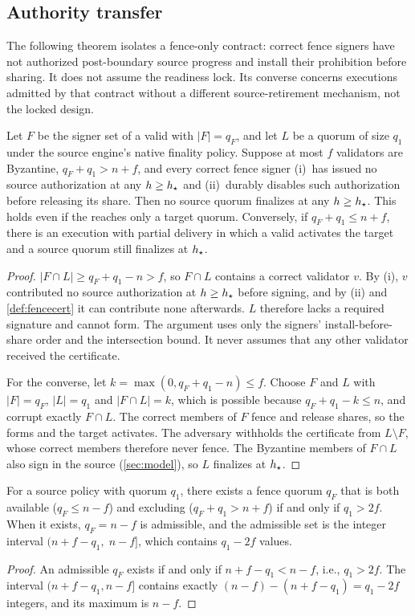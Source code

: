 \subsection{Authority transfer}
The following theorem isolates a fence-only contract: correct fence signers have not authorized
post-boundary source progress and install their prohibition before sharing. It does not assume the
readiness lock. Its converse concerns executions admitted by that contract without a different
source-retirement mechanism, not the locked \sage{} design.
\begin{theorem}
\label{th:authority-exclusion}
Let $F$ be the signer set of a valid \FenceCert{} with $|F|=q_F$, and let $L$ be a quorum of size
$q_1$ under the source engine's native finality policy. Suppose at most $f$ validators are Byzantine,
$q_F+q_1>n+f$, and every correct fence signer (i)~has issued no source authorization at any
$h\ge h_{\star}$ and (ii)~durably disables such authorization before releasing its share. Then no source
quorum finalizes at any $h\ge h_{\star}$. This holds even if the \FenceCert{} reaches only a target quorum.
Conversely, if $q_F+q_1\le n+f$, there is an execution with partial delivery in which a valid
\FenceCert{} activates the target and a source quorum still finalizes at $h_{\star}$.
\end{theorem}
\begin{proof}
$|F\cap L|\ge q_F+q_1-n>f$, so $F\cap L$ contains a correct validator $v$. By (i), $v$ contributed no
source authorization at $h\ge h_{\star}$ before signing, and by (ii) and \cref{def:fencecert} it can
contribute none afterwards. $L$ therefore lacks a required signature and cannot form. The argument uses
only the signers' install-before-share order and the intersection bound. It never assumes that any
other validator received the certificate.

For the converse, let $k=\max(0,q_F+q_1-n)\le f$. Choose $F$ and $L$ with $|F|=q_F$, $|L|=q_1$ and
$|F\cap L|=k$, which is possible because $q_F+q_1-k\le n$, and corrupt exactly $F\cap L$. The correct
members of $F$ fence and release shares, so the \FenceCert{} forms and the target activates. The
adversary withholds the certificate from $L\setminus F$, whose correct members therefore never fence.
The Byzantine members of $F\cap L$ also sign in the source (\cref{sec:model}), so $L$ finalizes at
$h_{\star}$.
\end{proof}

\begin{theorem}
\label{th:fence-admission}
For a source policy with quorum $q_1$, there exists a fence quorum $q_F$ that is both available
($q_F\le n-f$) and excluding ($q_F+q_1>n+f$) if and only if $q_1>2f$. When it exists, $q_F=n-f$ is
admissible, and the admissible set is the integer interval $(n+f-q_1,\;n-f]$, which contains $q_1-2f$
values.
\end{theorem}
\begin{proof}
An admissible $q_F$ exists if and only if $n+f-q_1<n-f$, i.e., $q_1>2f$. The interval
$(n+f-q_1,n-f]$ contains exactly $(n-f)-(n+f-q_1)=q_1-2f$ integers, and its maximum is $n-f$.
\end{proof}

